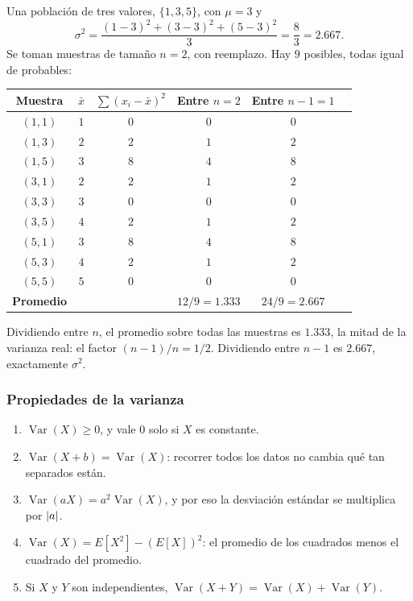 \documentclass[11pt,letterpaper]{article}
\begin{document}
\begin{ejemplo}
    Una población de tres valores, $\{1, 3, 5\}$, con $\mu = 3$ y
    \[
        \sigma^2 = \frac{(1-3)^2 + (3-3)^2 + (5-3)^2}{3}
                 = \frac{8}{3} = 2.667 .
    \]
    Se toman muestras de tamaño $n = 2$, con reemplazo. Hay $9$
    posibles, todas igual de probables:
    \begin{center}
    \small
    \begin{tabular}{cccccc}
        \toprule
        \textbf{Muestra} & $\bar{x}$ & $\sum (x_i - \bar{x})^2$
        & \textbf{Entre $n = 2$} & \textbf{Entre $n - 1 = 1$} \\
        \midrule
        $(1, 1)$ & $1$ & $0$ & $0$ & $0$ \\
        $(1, 3)$ & $2$ & $2$ & $1$ & $2$ \\
        $(1, 5)$ & $3$ & $8$ & $4$ & $8$ \\
        $(3, 1)$ & $2$ & $2$ & $1$ & $2$ \\
        $(3, 3)$ & $3$ & $0$ & $0$ & $0$ \\
        $(3, 5)$ & $4$ & $2$ & $1$ & $2$ \\
        $(5, 1)$ & $3$ & $8$ & $4$ & $8$ \\
        $(5, 3)$ & $4$ & $2$ & $1$ & $2$ \\
        $(5, 5)$ & $5$ & $0$ & $0$ & $0$ \\
        \midrule
        \textbf{Promedio} & & & $12/9 = 1.333$ & $24/9 = 2.667$ \\
        \bottomrule
    \end{tabular}
    \end{center}
    Dividiendo entre $n$, el promedio sobre todas las muestras es
    $1.333$, la mitad de la varianza real: el factor $(n-1)/n = 1/2$.
    Dividiendo entre $n - 1$ es $2.667$, exactamente $\sigma^2$.
\end{ejemplo}

\subsubsection*{Propiedades de la varianza}

\begin{enumerate}[itemsep=0.3em]
    \item $\operatorname{Var}(X) \geq 0$, y vale $0$ solo si $X$ es
          constante.
    \item $\operatorname{Var}(X + b) = \operatorname{Var}(X)$: recorrer
          todos los datos no cambia qué tan separados están.
    \item $\operatorname{Var}(aX) = a^2 \operatorname{Var}(X)$, y por
          eso la desviación estándar se multiplica por $\left\lvert a \right\rvert$.
    \item $\operatorname{Var}(X) = E[X^2] - (E[X])^2$: el promedio de
          los cuadrados menos el cuadrado del promedio.
    \item Si $X$ y $Y$ son independientes,
          $\operatorname{Var}(X + Y) = \operatorname{Var}(X) +
          \operatorname{Var}(Y)$.
\end{enumerate}
\end{document}
